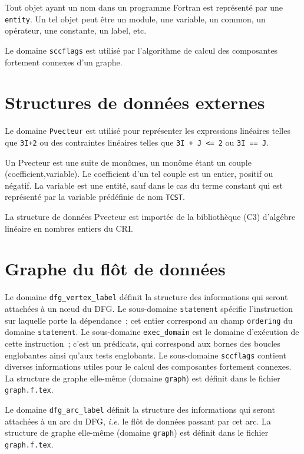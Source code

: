 \documentclass{article}
\begin{document}
{Tout objet ayant un nom dans un programme Fortran est repr\'esent\'e par une 
{\tt entity}. Un tel objet peut \^etre un module, une variable, un common, un 
op\'erateur, une constante, un label, etc.}

{Le domaine {\tt sccflags} est utilis\'e par l'algorithme de calcul des 
composantes fortement connexes d'un graphe.}

\section{Structures de donn\'ees externes}

{Le domaine {\tt Pvecteur} est utilis\'e pour repr\'esenter les expressions 
lin\'eaires telles que {\tt 3I+2} ou des contraintes lin\'eaires telles que 
{\tt 3I + J <= 2} ou {\tt 3I == J}.

Un Pvecteur est une suite de mon\^omes, un mon\^ome \'etant un couple 
(coefficient,variable). Le coefficient d'un tel couple est un entier, positif 
ou n\'egatif. La variable est une entit\'e, sauf dans le cas du terme constant 
qui est repr\'esent\'e par la variable pr\'ed\'efinie de nom {\tt TCST}.

La structure de donn\'ees Pvecteur est import\'ee de la biblioth\`eque (C3) 
d'alg\'ebre lin\'eaire en nombres entiers du CRI.}

\section{Graphe du fl\^ot de donn\'ees}

{Le domaine {\tt dfg\_vertex\_label} d\'efinit la structure des informations 
qui seront attach\'ees \`a un n\oe ud du DFG. Le sous-domaine {\tt statement} 
sp\'ecifie l'instruction sur laquelle porte la d\'e\-pen\-dance~; cet entier 
correspond au champ {\tt ordering} du domaine {\tt statement}. Le sous-domaine 
{\tt exec\_domain} est le domaine d'ex\'ecution de cette instruction~; c'est un
pr\'edicats, qui correspond aux bornes
des boucles englobantes ainsi qu'aux tests englobants. Le sous-domaine 
{\tt sccflags} contient diverses informations utiles pour le calcul des 
composantes fortement connexes. La structure de graphe elle-m\^eme (domaine 
{\tt graph}) est d\'efinit dans le fichier {\tt graph.f.tex}.}

{Le domaine {\tt dfg\_arc\_label} d\'efinit la structure des informations qui 
seront attach\'ees \`a un arc du DFG, {\em i.e.} le fl\^ot de donn\'ees 
passant par cet arc. La structure de graphe elle-m\^eme (domaine {\tt graph}) 
est d\'efinit dans le fichier {\tt graph.f.tex}.}
\end{document}
